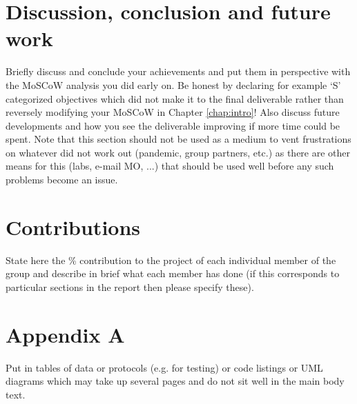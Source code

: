 \documentclass[a4paper, oneside, 11pt]{report}
\begin{document}
\chapter{Discussion, conclusion and future work}

Briefly discuss and conclude your achievements and put them in perspective with the MoSCoW analysis you did early on. Be honest by declaring for example `S' categorized objectives which did not make it to the final deliverable rather than reversely modifying your MoSCoW in Chapter \ref{chap:intro}! Also discuss future developments and how you see the deliverable improving if more time could be spent. Note that this section should not be used as a medium to vent frustrations on whatever did not work out (pandemic, group partners, etc.) as there are other means for this (labs, e-mail MO, ...) that should be used well before any such problems become an issue.





\chapter*{Contributions}

State here the \% contribution to the project of each individual member of the group and describe in brief what each member has done (if this corresponds to particular sections in the report then please specify these).

\chapter*{Appendix A}

Put in tables of data or protocols (e.g. for testing) or code listings or UML diagrams which may take up several pages and do not sit well in the main body text.
\end{document}
